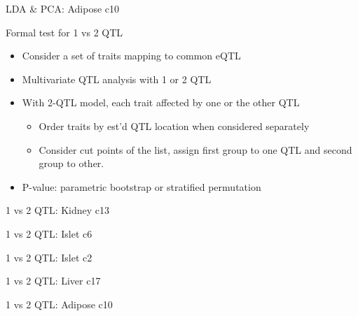 \documentclass[12pt,t]{beamer}
\begin{document}
\begin{frame}[c]{LDA \& PCA: Adipose c10}
\end{frame}





\begin{frame}[c]{Formal test for 1 vs 2 QTL}

  \begin{itemize}
  \itemsep12pt
  \item Consider a set of traits mapping to common eQTL
  \item Multivariate QTL analysis with 1 or 2 QTL
  \item With 2-QTL model, each trait affected by one or the other QTL
    \vspace*{8pt}
    \begin{itemize}
      \itemsep8pt
      \item Order traits by est'd QTL location when considered
        separately
      \item Consider cut points of the list, assign first group to one
        QTL and second group to other.
    \end{itemize}
  \item P-value: parametric bootstrap or stratified permutation
  \end{itemize}

\end{frame}


\begin{frame}[c]{1 vs 2 QTL: Kidney c13}
\end{frame}

\begin{frame}[c]{1 vs 2 QTL: Islet c6}
\end{frame}

\begin{frame}[c]{1 vs 2 QTL: Islet c2}
\end{frame}

\begin{frame}[c]{1 vs 2 QTL: Liver c17}
\end{frame}

\begin{frame}[c]{1 vs 2 QTL: Adipose c10}
\end{frame}
\end{document}
